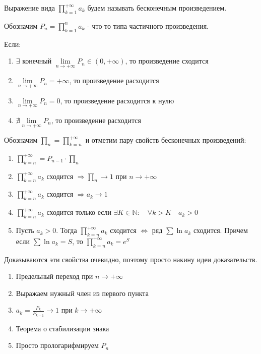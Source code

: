 \documentclass{article}
\begin{document}
Выражение вида $\prod\limits_{k=1}^{+\infty}a_k$ будем называть бесконечным произведением. 

Обозначим $P_n = \prod\limits_{k=1}^{n}a_k$ - что-то типа частичного произведения.

Если:
\begin{enumerate}
    \item $\exists $ конечный $ \lim\limits_{n\to+\infty} P_n \in (0, +\infty)$, то произведение сходится
    \item $\lim\limits_{n\to+\infty} P_n = +\infty$, то произведение расходится
    \item $\lim\limits_{n\to+\infty} P_n = 0$, то произведение расходится к нулю
    \item $\nexists \lim\limits_{n\to+\infty} P_n$, то произведение расходится
\end{enumerate}


Обозначим $\prod_n = \prod\limits_{k=n}^{+\infty}$ и отметим пару свойств бесконечных произведений:
\begin{enumerate}
    \item $\prod\limits_{k=n}^{+\infty} = P_{n - 1} \cdot \prod_n$ 
    \item $\prod\limits_{k=n}^{+\infty} a_k$ сходится $\Rightarrow \prod_n \to 1$ при $n \to +\infty$ 
    \item $\prod\limits_{k=n}^{+\infty} a_k$ сходится $\Rightarrow a_k \to 1$
    \item $\prod\limits_{k=n}^{+\infty} a_k$ сходится только если $\exists K \in \mathbb{N}:\quad \forall k > K \quad a_k > 0$
    \item Пусть $a_k >0$. Тогда $\prod\limits_{k=n}^{+\infty} a_k$ сходится $\Leftrightarrow$ ряд $\sum \ln{a_k}$ сходится. Причем если $\sum \ln{a_k} = S$, то $\prod\limits_{k=n}^{+\infty} a_k = e^S$
\end{enumerate}

Доказываются эти свойства очевидно, поэтому просто накину идеи доказательств. 

\begin{enumerate}
    \item Предельный переход при $n\to +\infty$
    \item Выражаем нужный член из первого пункта
    \item $a_k = \frac{P_k}{P_{k-1}} \to 1$ при $k \to +\infty$
    \item Теорема о стабилизации знака
    \item Просто прологарифмируем $P_n$
\end{enumerate}
\end{document}
